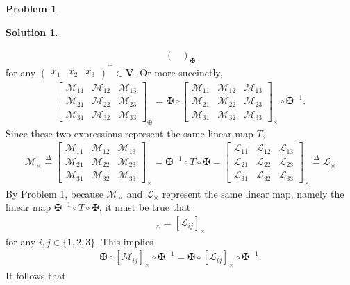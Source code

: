 \documentclass{article}
\theoremstyle{definition}
\newtheorem*{prob*}{Problem}
\newtheorem*{sln*}{Solution}
\newcommand{\V}{\mathbf{V}}
\newcommand{\lag}{\mathcal{L}}
\newcommand{\M}{\mathcal{M}}
\begin{document}
\begin{prob*}
\begin{sln*}
\begin{enumerate}
\begin{align*}
\begin{pmatrix}
			\end{pmatrix}_{\maltese}
			\end{align*}
			for any $\begin{pmatrix}
			x_1&x_2&x_3
			\end{pmatrix}^\top \in \V$. Or more succinctly, 
			\begin{align*}
			\begin{bmatrix}
			\M_{11} & \M_{12} & \M_{13}\\
			\M_{21} & \M_{22} & \M_{23}\\
			\M_{31} & \M_{32} & \M_{33}
			\end{bmatrix}_\oplus =
			\maltese
			\circ
			\begin{bmatrix}
			\M_{11} & \M_{12} & \M_{13}\\
			\M_{21} & \M_{22} & \M_{23}\\
			\M_{31} & \M_{32} & \M_{33}
			\end{bmatrix}_\times 
			\circ 
			\maltese^{-1}.
			\end{align*}
			Since these two expressions represent the same linear map $T$,
			\begin{align*}
			\M_\times \stackrel{\Delta }{=}\begin{bmatrix}
			\M_{11} & \M_{12} & \M_{13}\\
			\M_{21} & \M_{22} & \M_{23}\\
			\M_{31} & \M_{32} & \M_{33}
			\end{bmatrix}_\times = \maltese^{-1}\circ T \circ \maltese = \begin{bmatrix}
			\lag_{11} & \lag_{12} & \lag_{13}\\
			\lag_{21} & \lag_{22} & \lag_{23}\\
			\lag_{31} & \lag_{32} & \lag_{33}
			\end{bmatrix}_\times \stackrel{\Delta}{=} \lag_\times
			\end{align*}
			By Problem 1, because $\M_\times$ and $\lag_\times$ represent the same linear map, namely the linear map $\maltese^{-1}\circ T \circ \maltese$, it must be true that
			\begin{align*}
			[\M_{ij}]_\times = [\lag_{ij}]_\times
			\end{align*}
			for any $i,j \in \{ 1,2,3\}$. This implies
			\begin{align*}
			\maltese\circ [\M_{ij}]_\times \circ \maltese^{-1} = \maltese \circ [\lag_{ij}]_\times \circ \maltese^{-1}.
			\end{align*}
			 It follows that
			 \begin{align*}

\end{align*}
\end{enumerate}
\end{sln*}
\end{prob*}
\end{document}
